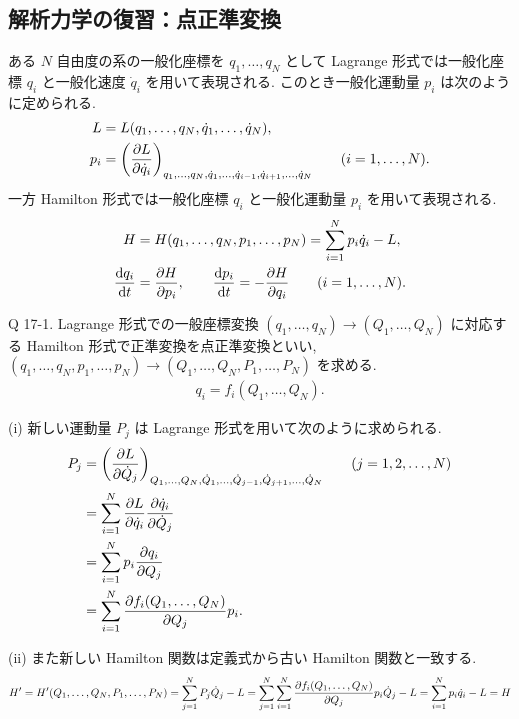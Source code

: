 \documentclass[uplatex,dvipdfmx,a4paper,11pt]{jlreq}
\theoremstyle{definition}
\begin{document}
\subsection{解析力学の復習：点正準変換}
ある $N$ 自由度の系の一般化座標を $q_1, \ldots, q_N$ として Lagrange 形式では一般化座標 $q_i$ と一般化速度 $\dot{q}_i$ を用いて表現される. このとき一般化運動量 $p_i$ は次のように定められる.
\begin{align}
  L   & = L(q_1,\ldots,q_N,\dot{q}_1,\ldots,\dot{q}_N),                                                                                    \\
  p_i & = \qty(\pdv{L}{\dot{q}_i})_{q_1,\ldots,q_N,\dot{q}_1,\ldots,\dot{q}_{i-1},\dot{q}_{i+1},\ldots,\dot{q}_N} \qquad (i = 1,\ldots,N).
\end{align}
一方 Hamilton 形式では一般化座標 $q_i$ と一般化運動量 $p_i$ を用いて表現される.
\begin{align}
  H           & = H(q_1,\ldots,q_N,p_1,\ldots,p_N) = \sum_{i=1}^{N}p_i\dot{q}_i - L,        \\
  \dv{q_i}{t} & = \pdv{H}{p_i}, \qquad \dv{p_i}{t} = -\pdv{H}{q_i} \qquad (i = 1,\ldots,N).
\end{align}

\begin{itembox}[l]{Q 17-1.}
  Lagrange 形式での一般座標変換 $(q_1,\ldots,q_N)\to(Q_1,\ldots,Q_N)$ に対応する Hamilton 形式で正準変換を点正準変換といい, $(q_1,\ldots,q_N,p_1,\ldots,p_N)\to(Q_1,\ldots,Q_N,P_1,\ldots,P_N)$ を求める.
  \begin{align}
    q_i = f_i(Q_1,\ldots,Q_N).
  \end{align}
\end{itembox}

(i) 新しい運動量 $P_j$ は Lagrange 形式を用いて次のように求められる.
\begin{align}
  P_j & = \qty(\pdv{L}{\dot{Q}_j})_{Q_1,\ldots,Q_N,\dot{Q}_1,\ldots,\dot{Q}_{j-1},\dot{Q}_{j+1},\ldots,\dot{Q}_N} \qquad (j=1,2,\ldots,N) \\
      & = \sum_{i=1}^{N}\pdv{L}{\dot{q}_i}\pdv{\dot{q}_i}{\dot{Q}_j}                                                                      \\
      & = \sum_{i=1}^{N}p_i\pdv{q_i}{Q_j}                                                                                                 \\
      & = \sum_{i=1}^{N}\pdv{f_i(Q_1,\ldots,Q_N)}{Q_j}p_i.
\end{align}

(ii) また新しい Hamilton 関数は定義式から古い Hamilton 関数と一致する.
\begin{align}
  H' = H'(Q_1,\ldots,Q_N,P_1,\ldots,P_N) = \sum_{j=1}^{N}P_j\dot{Q}_j - L = \sum_{j=1}^{N}\sum_{i=1}^{N}\pdv{f_i(Q_1,\ldots,Q_N)}{Q_j}p_i\dot{Q}_j - L = \sum_{i=1}^{N}p_i\dot{q}_i - L = H
\end{align}
\end{document}
